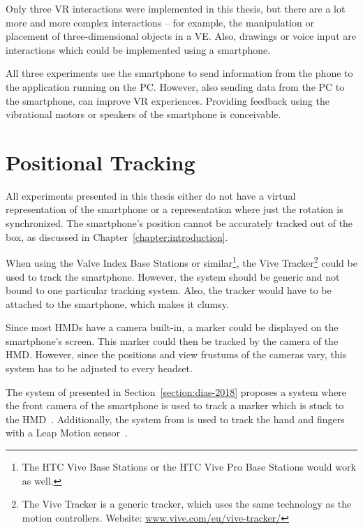 Only three \gls{VR} interactions were implemented in this thesis, but there are a lot more and more complex interactions -- for example, the manipulation or placement of three-dimensional objects in a \gls{VE}. Also, drawings or voice input are interactions which could be implemented using a smartphone. %

All three experiments use the smartphone to send information from the phone to the application running on the \gls{PC}. However, also sending data from the \gls{PC} to the smartphone, can improve \gls{VR} experiences. Providing feedback using the vibrational motors or speakers of the smartphone is conceivable.


\section{Positional Tracking}\label{section:fw-positionaTl-tracking}

All experiments presented in this thesis either do not have a virtual representation of the smartphone or a representation where just the rotation is synchronized. The smartphone's position cannot be accurately tracked out of the box, as discussed in Chapter~\ref{chapter:introduction}.

When using the Valve Index Base Stations or similar\footnote{The HTC Vive Base Stations or the HTC Vive Pro Base Stations would work as well.}, the Vive Tracker\footnote{The Vive Tracker is a generic tracker, which uses the same technology as the motion controllers. Website: \href{https://www.vive.com/eu/vive-tracker/}{www.vive.com/eu/vive-tracker/}} could be used to track the smartphone. However, the system should be generic and not bound to one particular tracking system. Also, the tracker would have to be attached to the smartphone, which makes it clumsy.

Since most \glspl{HMD} have a camera built-in, a marker could be displayed on the smartphone's screen. This marker could then be tracked by the camera of the \gls{HMD}. However, since the positions and view frustums of the cameras vary, this system has to be adjusted to every headset.

The system of \citeauthor{Dias.2018} presented in Section~\ref{section:dias-2018} proposes a system where the front camera of the smartphone is used to track a marker which is stuck to the \gls{HMD}~\cite[4]{Dias.2018}. Additionally, the system from \citeauthor{Afonso.2017} is used to track the hand and fingers with a Leap Motion sensor~\cite[247]{Afonso.2017}.

